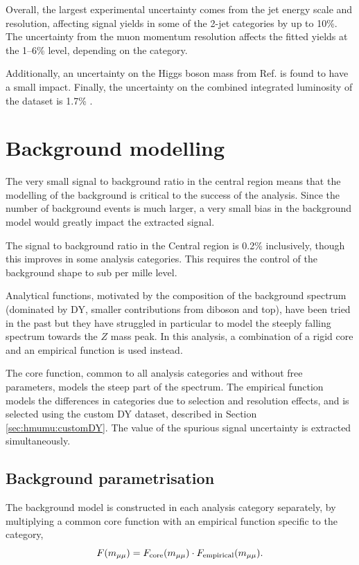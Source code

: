 Overall, the largest experimental uncertainty comes from the
jet energy scale and resolution, affecting signal yields in some
of the 2-jet categories by up to 10\%. The uncertainty from
the muon momentum resolution affects the fitted yields at the
1--6\% level, depending on the category.

Additionally, an uncertainty on the Higgs boson mass from Ref.
\cite{Aad:2015zhl} is found to have a
small impact. Finally, the uncertainty on the combined integrated
luminosity of the dataset is 1.7\%
\cite{ATLAS-CONF-2019-021, Aaboud:2016hhf}.


\section{Background modelling}

The very small signal to background ratio in the central region
means that the modelling of the background is critical to the
success of the analysis. Since the number of background events
is much larger, a very small bias in the background model would
greatly impact the extracted signal.

The signal to background ratio in the Central region is 0.2\% inclusively,
though this improves in some analysis categories. This requires
the control of the background shape to sub per mille level.

Analytical functions, motivated by the composition of the
background spectrum (dominated by DY, smaller contributions
from diboson and top), have been tried in the past but they have
struggled in particular to model the steeply falling spectrum
towards the $Z$ mass peak. In this analysis, a combination
of a rigid core and an empirical function is used instead.

The core function, common to all analysis categories and without
free parameters, models the steep part of the spectrum. The
empirical function models the differences in categories
due to selection and resolution effects, and is selected
using the custom DY dataset, described in Section \ref{sec:hmumu:customDY}.
The value of the spurious signal uncertainty is extracted
simultaneously.

\subsection{Background parametrisation}

The background model is constructed in each analysis category
separately, by multiplying a common core function with an
empirical function specific to the category,
\begin{equation}
\label{eq:hmumu:bkg}
F(m_{\mu\mu}) = F_\text{core}(m_{\mu\mu}) \cdot F_{\text{empirical}}(m_{\mu\mu}).
\end{equation}

